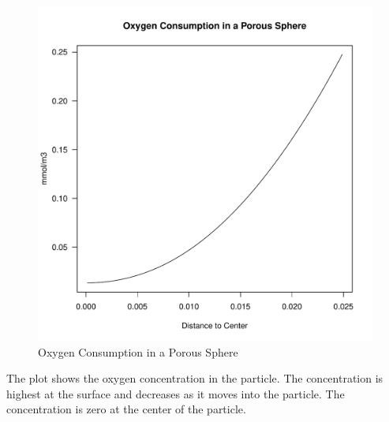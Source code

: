 \documentclass{tufte-handout}\usepackage[]{graphicx}\usepackage[]{xcolor}
\makeatletter
\def\maxwidth{ %
  \ifdim\Gin@nat@width>\linewidth
    \linewidth
  \else
    \Gin@nat@width
  \fi
}
\newenvironment{knitrout}{}{} %
\makeatother
\begin{document}
\begin{figure}[h]
\centering
\caption{Oxygen Consumption in a Porous Sphere}
\begin{knitrout}
\color{fgcolor}
\includegraphics[width=\maxwidth]{figure/plotO2agg-1} 
\end{knitrout}
\end{figure}

The plot shows the oxygen concentration in the particle. The concentration is highest at the surface and decreases as it moves into the particle. The concentration is zero at the center of the particle.
\end{document}
